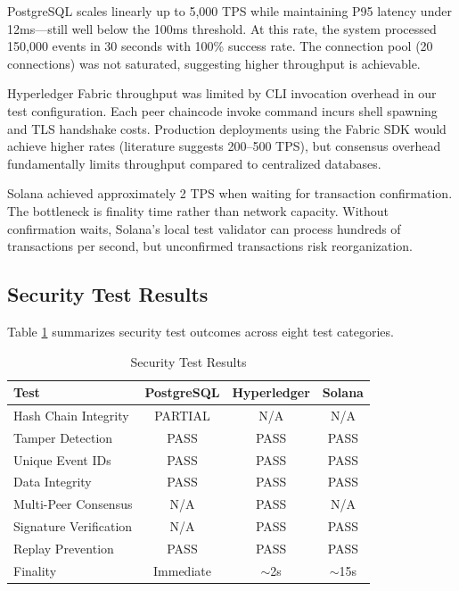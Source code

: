 \documentclass[conference]{IEEEtran}
\begin{document}
PostgreSQL scales linearly up to 5,000 TPS while maintaining P95 latency under 12ms---still well below the 100ms threshold. At this rate, the system processed 150,000 events in 30 seconds with 100\% success rate. The connection pool (20 connections) was not saturated, suggesting higher throughput is achievable.

Hyperledger Fabric throughput was limited by CLI invocation overhead in our test configuration. Each peer chaincode invoke command incurs shell spawning and TLS handshake costs. Production deployments using the Fabric SDK would achieve higher rates (literature suggests 200--500 TPS), but consensus overhead fundamentally limits throughput compared to centralized databases.

Solana achieved approximately 2 TPS when waiting for transaction confirmation. The bottleneck is finality time rather than network capacity. Without confirmation waits, Solana's local test validator can process hundreds of transactions per second, but unconfirmed transactions risk reorganization.

\subsection{Security Test Results}

Table \ref{tab:security_results} summarizes security test outcomes across eight test categories.

\begin{table}[htbp]
\caption{Security Test Results}
\label{tab:security_results}
\centering
\begin{tabular}{lccc}
\toprule
\textbf{Test} & \textbf{PostgreSQL} & \textbf{Hyperledger} & \textbf{Solana} \\
\midrule
Hash Chain Integrity & PARTIAL & N/A & N/A \\
Tamper Detection & PASS & PASS & PASS \\
Unique Event IDs & PASS & PASS & PASS \\
Data Integrity & PASS & PASS & PASS \\
Multi-Peer Consensus & N/A & PASS & N/A \\
Signature Verification & N/A & PASS & PASS \\
Replay Prevention & PASS & PASS & PASS \\
Finality & Immediate & $\sim$2s & $\sim$15s \\
\bottomrule
\end{tabular}
\end{table}
\end{document}
